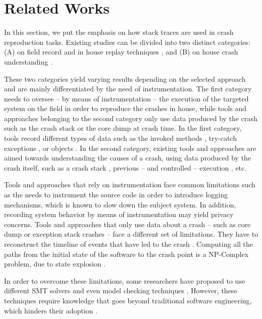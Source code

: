 \documentclass[times]{smrauth}
\begin{document}
\section{Related Works\label{sec:rel-work}}

In this section, we put the emphasis on how stack traces are used in crash reproduction tasks. 
Existing studies can be divided into two distinct categories: (A) on field record and in house replay techniques \cite{Steven2000,Narayanasamy2005,Artzi2008,Roehm2015}, and (B) on house crash understanding \cite{Jin2012,Jin2013,Zuddas2014,Chen2013a,Nayrolles2015}. 

These two categories yield varying results depending on the selected approach and are mainly differentiated by the need of instrumentation. 
The first category needs to oversee -- by means of instrumentation -- the execution of the targeted system on the field in order to reproduce the crashes in house, while tools and approaches belonging to the second category only use data produced by the crash such as the crash stack or the core dump at crash time. In the first category, tools record different types of data such as the invoked methods \cite{Narayanasamy2005}, try-catch exceptions \cite{Rossler2013}, or objects \cite{Jaygarl}. In the second category, existing tools and approaches are aimed towards understanding the causes of a crash, using data produced by the crash itself, such as a crash stack \cite{Chen2013a}, previous -- and controlled -- execution \cite{Zuddas2014}, etc. 

Tools and approaches that rely on instrumentation face common limitations such as the needs to instrument the source code in order to introduce logging mechanisms\cite{Narayanasamy2005,Jaygarl,Artzi2008}, which is known to slow down the subject system. 
In addition,  recording system behavior by means of instrumentation may yield privacy concerns. 
Tools and approaches that only use data about a crash -- such as core dump or exception stack crashes -- face a different set of limitations. They have to reconstruct the timeline of events that have led to the crash \cite{Chen2013a,Nayrolles2015}. Computing all the paths from the initial state of the software to the crash point is a NP-Complex problem, due to state explosion \cite{Chen2013a,Clause2007}.

In order to overcome these limitations, some researchers have proposed to use different SMT solvers \cite{Dutertre2006} and even model checking techniques \cite{Visser2003}. 
However, these techniques require knowledge that goes beyond traditional software engineering, which hinders their adoption  \cite{Visser2004}.
\end{document}
